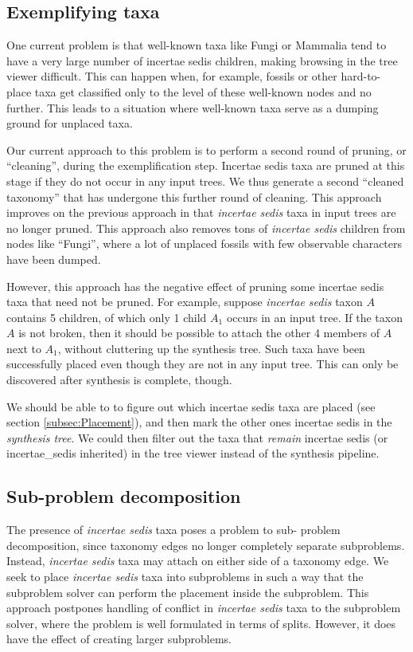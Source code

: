 \documentclass[english]{article}
\begin{document}
\subsection{Exemplifying taxa}

One current problem is that well-known taxa like Fungi or Mammalia
tend to have a very large number of incertae sedis children, making
browsing in the tree viewer difficult.
This can happen when, for
example, fossils or other hard-to- place taxa get classified only to
the level of these well-known nodes and no further.
This leads to a
situation where well-known taxa serve as a dumping ground for unplaced
taxa.

Our current approach to this problem is to perform a second round of
pruning, or ``cleaning'', during the exemplification step.
Incertae
sedis taxa are pruned at this stage if they do not occur in any input
trees.
We thus generate a second ``cleaned taxonomy'' that has
undergone this further round of cleaning.
This approach improves on
the previous approach in that \emph{incertae sedis} taxa in input
trees are no longer pruned.
This approach also removes tons of
\emph{incertae sedis} children from nodes like ``Fungi'', where a lot
of unplaced fossils with few observable characters have been dumped.

However, this approach has the negative effect of pruning some
incertae sedis taxa that need not be pruned.
For example, suppose
\emph{incertae sedis} taxon $A$ contains 5 children, of which only 1
child $A_{1}$ occurs in an input tree.
If the taxon $A$ is not broken,
then it should be possible to attach the other 4 members of $A$ next
to $A_{1}$, without cluttering up the synthesis tree.
Such taxa have
been successfully placed even though they are not in any input tree.
This can only be discovered after synthesis is complete, though.

We should be able to to figure out which incertae sedis taxa are
placed (see section \ref{subsec:Placement}), and then mark the other
ones incertae sedis in the \emph{synthesis tree}.
We could then filter
out the taxa that \emph{remain }incertae sedis (or incertae\_sedis
inherited) in the tree viewer instead of the synthesis pipeline.

\subsection{Sub-problem decomposition}

The presence of \emph{incertae sedis }taxa poses a problem to sub-
problem decomposition, since taxonomy edges no longer completely
separate subproblems.
Instead, \emph{incertae sedis} taxa may attach
on either side of a taxonomy edge.
We seek to place \emph{incertae
sedis} taxa into subproblems in such a way that the subproblem solver
can perform the placement inside the subproblem.
This approach
postpones handling of conflict in \emph{incertae sedis} taxa to the
subproblem solver, where the problem is well formulated in terms of
splits.
However, it does have the effect of creating larger
subproblems.
\end{document}
